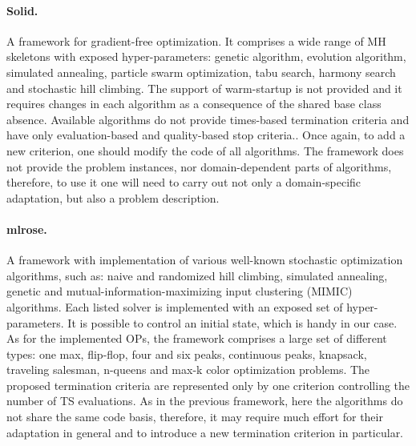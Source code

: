 \paragraph{Solid.} A framework for gradient-free optimization. It comprises a wide range of MH skeletons with exposed hyper-parameters: genetic algorithm, evolution algorithm, simulated annealing, particle swarm optimization, tabu search, harmony search and stochastic hill climbing. The support of warm-startup is not provided and it requires changes in each algorithm as a consequence of the shared base class absence. Available algorithms do not provide times-based termination criteria and have only evaluation-based and quality-based stop criteria.. Once again, to add a new criterion, one should modify the code of all algorithms. The framework does not provide the problem instances, nor domain-dependent parts of algorithms, therefore, to use it one will need to carry out not only a domain-specific adaptation, but also a problem description.

\paragraph{mlrose.} A framework with implementation of various well-known stochastic optimization algorithms, such as: naive and randomized hill climbing, simulated annealing, genetic and mutual-information-maximizing input clustering (MIMIC) algorithms. Each listed solver is implemented with an exposed set of hyper-parameters. It is possible to control an initial state, which is handy in our case. As for the implemented OPs, the framework comprises a large set of different types: one max, flip-flop, four and six peaks, continuous peaks, knapsack, traveling salesman, n-queens and max-k color optimization problems. The proposed termination criteria are represented only by one criterion controlling the number of TS evaluations. As in the previous framework, here the algorithms do not share the same code basis, therefore, it may require much effort for their adaptation in general and to introduce a new termination criterion in particular.

